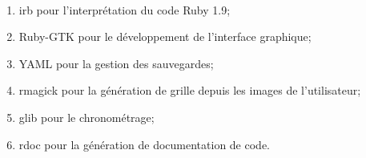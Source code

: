 	\paragraph*{}
	\begin{enumerate}
		\item irb pour l'interprétation du code Ruby 1.9;
		\item Ruby-GTK pour le développement de l'interface graphique;
		\item YAML pour la gestion des sauvegardes; %
		\item rmagick pour la génération de grille depuis les images de l'utilisateur;
		\item glib pour le chronométrage;
		\item rdoc pour la génération de documentation de code.
	\end{enumerate}






